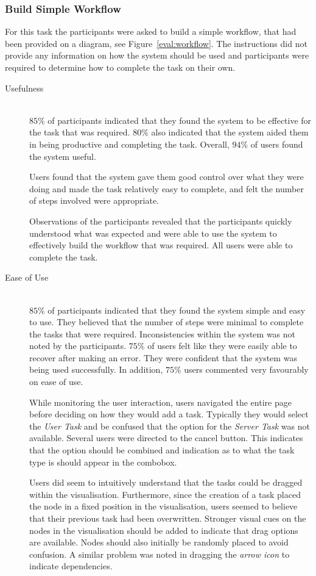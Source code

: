 \documentclass[12pt,a4paper]{report}
\begin{document}
\subsubsection{Build Simple Workflow\label{eval:simple}}
For this task the participants were asked to build a simple workflow, that had
been provided on a diagram, see Figure~\ref{eval:workflow}. The instructions
did not provide any information on how the system should be used and
participants were required to determine how to complete the task on their own.
\begin{description}
\item[Usefulness] \hfill \\
    $85\%$ of participants indicated that they found the system to be
    effective for the task that was required. $80\%$ also indicated that
    the system aided them in being productive and completing the task.
    Overall, $94\%$ of users found the system useful.

    Users found that the system gave them good control over what they were doing and
    made the task relatively easy to complete, and felt the number of steps
    involved were appropriate.

    Observations of the participants revealed that the participants quickly
    understood what was expected and were able to use the system to
    effectively build the workflow that was required. All users were able to
    complete the task.
\item[Ease of Use] \hfill \\
    $85\%$ of participants indicated that they found the system simple and easy to use.
    They believed that the number of steps were minimal to complete the tasks
    that were required. Inconsistencies within the system was not noted by
    the participants. $75\%$ of users felt like they were easily able to recover after
    making an error. They were confident that the system was being used
    successfully. In addition, $75\%$ users commented very favourably on
    ease of use.

    While monitoring the user interaction, users navigated the entire page before
    deciding on how they would add a task. Typically they would select the
    \emph{User Task} and be confused that the option for the \emph{Server Task}
    was  not available. Several users were directed to the cancel button. This
    indicates that the option should be combined and indication as to what the
    task type is should appear in the combobox.

    Users did seem to intuitively understand that the tasks could be dragged
    within
    the visualisation. Furthermore, since the creation of a task placed the node
    in a fixed position in the visualisation, users seemed to believe that their previous task
    had been overwritten. Stronger visual cues on the nodes in the visualisation
    should be added to indicate that drag options are available. Nodes should
    also initially be randomly placed to avoid confusion. A similar problem was
    noted in dragging the \emph{arrow icon} to indicate dependencies.


\end{description}
\end{document}
